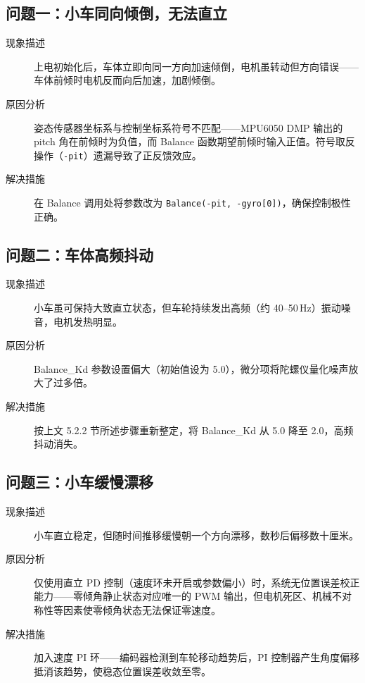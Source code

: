 \documentclass[12pt,a4paper,UTF8]{ctexrep}
\begin{document}
\subsection{问题一：小车同向倾倒，无法直立}

\begin{description}
  \item[现象描述] 上电初始化后，车体立即向同一方向加速倾倒，电机虽转动但方向错误——车体前倾时电机反而向后加速，加剧倾倒。
  \item[原因分析] 姿态传感器坐标系与控制坐标系符号不匹配——MPU6050 DMP 输出的 pitch 角在前倾时为负值，而 Balance 函数期望前倾时输入正值。符号取反操作（\texttt{-pit}）遗漏导致了正反馈效应。
  \item[解决措施] 在 Balance 调用处将参数改为 \texttt{Balance(-pit, -gyro[0])}，确保控制极性正确。
\end{description}

\subsection{问题二：车体高频抖动}

\begin{description}
  \item[现象描述] 小车虽可保持大致直立状态，但车轮持续发出高频（约 40–50\,Hz）振动噪音，电机发热明显。
  \item[原因分析] Balance\_Kd 参数设置偏大（初始值设为 5.0），微分项将陀螺仪量化噪声放大了过多倍。
  \item[解决措施] 按上文 5.2.2 节所述步骤重新整定，将 Balance\_Kd 从 5.0 降至 2.0，高频抖动消失。
\end{description}

\subsection{问题三：小车缓慢漂移}

\begin{description}
  \item[现象描述] 小车直立稳定，但随时间推移缓慢朝一个方向漂移，数秒后偏移数十厘米。
  \item[原因分析] 仅使用直立 PD 控制（速度环未开启或参数偏小）时，系统无位置误差校正能力——零倾角静止状态对应唯一的 PWM 输出，但电机死区、机械不对称性等因素使零倾角状态无法保证零速度。
  \item[解决措施] 加入速度 PI 环——编码器检测到车轮移动趋势后，PI 控制器产生角度偏移抵消该趋势，使稳态位置误差收敛至零。
\end{description}
\end{document}
